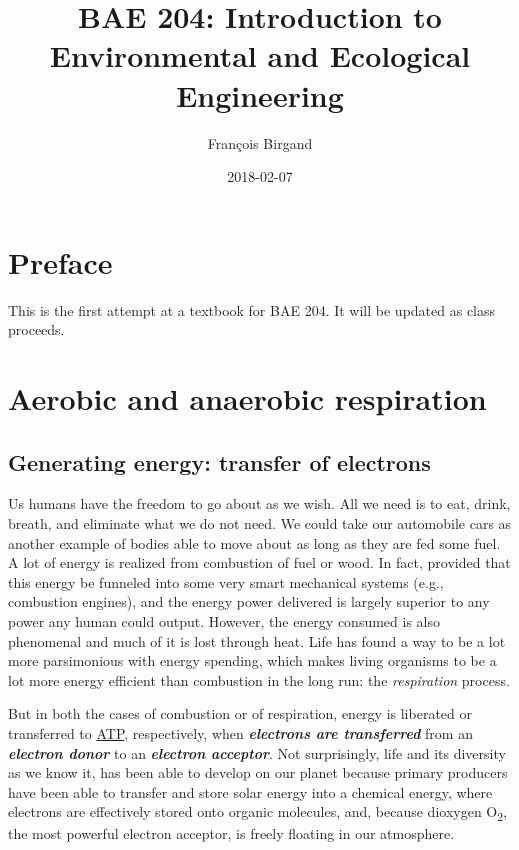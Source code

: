 \documentclass[]{book}
\title{BAE 204: Introduction to Environmental and Ecological Engineering}
\author{François Birgand}
\date{2018-02-07}
\theoremstyle{definition}
\theoremstyle{definition}
\theoremstyle{definition}
\theoremstyle{remark}
\begin{document}
\maketitle

{
\setcounter{tocdepth}{1}
\tableofcontents
}
\chapter*{Preface}\label{preface}

This is the first attempt at a textbook for BAE 204. It will be updated
as class proceeds.

\chapter{Aerobic and anaerobic
respiration}\label{aerobic-and-anaerobic-respiration}

\section{Generating energy: transfer of
electrons}\label{generating-energy-transfer-of-electrons}

Us humans have the freedom to go about as we wish. All we need is to
eat, drink, breath, and eliminate what we do not need. We could take our
automobile cars as another example of bodies able to move about as long
as they are fed some fuel. A lot of energy is realized from combustion
of fuel or wood. In fact, provided that this energy be funneled into
some very smart mechanical systems (e.g., combustion engines), and the
energy power delivered is largely superior to any power any human could
output. However, the energy consumed is also phenomenal and much of it
is lost through heat. Life has found a way to be a lot more parsimonious
with energy spending, which makes living organisms to be a lot more
energy efficient than combustion in the long run: the \emph{respiration}
process.

But in both the cases of combustion or of respiration, energy is
liberated or transferred to \protect\hyperlink{ATP}{ATP}, respectively,
when \emph{\textbf{electrons are transferred}} from an
\emph{\textbf{electron donor}} to an \emph{\textbf{electron acceptor}}.
Not surprisingly, life and its diversity as we know it, has been able to
develop on our planet because primary producers have been able to
transfer and store solar energy into a chemical energy, where electrons
are effectively stored onto organic molecules, and, because dioxygen
O\textsubscript{2}, the most powerful electron acceptor, is freely
floating in our atmosphere.
\end{document}

